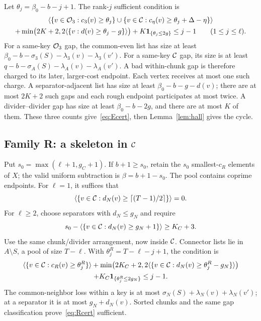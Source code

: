 Let $\theta_j=\beta_0-b-j+1$. The rank-$j$ sufficient condition is
\begin{multline}\label{eq:Ecert}
 \left\langle\{v\in\mathcal O_3:c_3(v)\ge\theta_j\}
       \cup\{v\in\mathcal C:c_\eta(v)\ge\theta_j+\Delta-\eta\}\right\rangle\\
 +\min\bigl(2K+2,2\langle\{v:d(v)\ge\theta_j-g\}\rangle\bigr)
 +K\mathbf 1_{\{\theta_j\le2g\}}\le j-1
 \qquad(1\le j\le\ell).
\end{multline}
For a same-key $\mathcal O_3$ gap, the common-even list has size at least
$\beta_0-b-\sigma_3(S)-\lambda_3(v)-\lambda_3(v')$.
For a same-key $\mathcal C$ gap, its size is at least
$q-b-\sigma_A(S)-\lambda_A(v)-\lambda_A(v')$.
A bad within-chunk gap is therefore charged to its later, larger-cost endpoint. Each vertex receives at most one such charge. A separator-adjacent list has size at least $\beta_0-b-g-d(v)$; there are at most $2K+2$ such gaps and each rough endpoint participates at most twice. A divider--divider gap has size at least $\beta_0-b-2g$, and there are at most $K$ of them. These three counts give~\eqref{eq:Ecert}, then Lemma~\ref{lem:hall} gives the cycle.

\subsection{Family R: a skeleton in $\mathcal C$}
Put $s_0=\max(\ell+1,g_C+1)$. If $b+1\ge s_0$, retain the $s_0$ smallest-$c_R$ elements of $X$; the valid uniform subtraction is $\beta=b+1-s_0$. The pool contains coprime endpoints. For $\ell=1$, it suffices that
\[
 \left\langle\left\{v\in\mathcal C:d_N(v)\ge\left\lceil(T-1)/2\right\rceil\right\}\right\rangle=0.
\]
For $\ell\ge2$, choose separators with $d_N\le g_N$ and require
\[
 s_0-\langle\{v\in\mathcal C:d_N(v)\ge g_N+1\}\rangle\ge K_C+3.
\]
Use the same chunk/divider arrangement, now inside $\mathcal C$. Connector lists lie in $A\setminus S$, a pool of size $T-\ell$. With $\theta_j^R=T-\ell-j+1$, the condition is
\begin{multline}\label{eq:Rcert}
 \langle\{v\in\mathcal C:c_R(v)\ge\theta_j^R\}\rangle
 +\min\bigl(2K_C+2,2\langle\{v\in\mathcal C:d_N(v)\ge\theta_j^R-g_N\}\rangle\bigr)\\
 +K_C\mathbf 1_{\{\theta_j^R\le2g_N\}}\le j-1.
\end{multline}
The common-neighbor loss within a key is at most
$\sigma_N(S)+\lambda_N(v)+\lambda_N(v')$; at a separator it is at most $g_N+d_N(v)$. Sorted chunks and the same gap classification prove~\eqref{eq:Rcert} sufficient.

